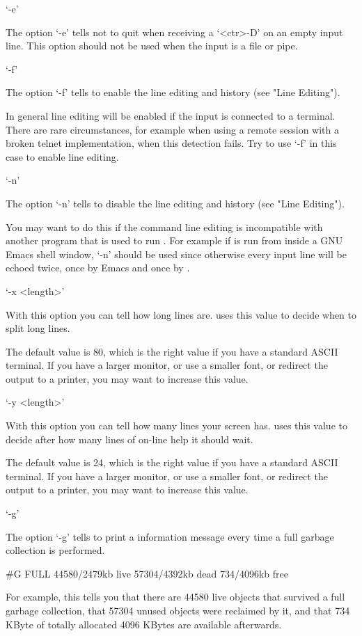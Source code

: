 `-e'

The option `-e' tells {\GAP} not to quit when receiving a `<ctr>-D' on an
empty  input line.  This option  should not be  used when  the input is a
file or pipe.

`-f'

The option `-f' tells {\GAP} to enable the line  editing and history (see
"Line Editing").

In general  line editing will  be enabled if the input  is connected to a
terminal.  There are rare circumstances, for  example when using a remote
session with a broken telnet  implementation, when this detection  fails.
Try to use `-f' in this case to enable line editing.

`-n'

The option  `-n'  tells {\GAP}  to disable  the line editing  and history
(see "Line Editing").

You may want to do this if the command line  editing is incompatible with
another program that is used to run {\GAP}.  For example if {\GAP} is run
from inside a GNU Emacs shell window, `-n' should be used since otherwise
every input line will be echoed twice, once by Emacs and once by {\GAP}.

`-x <length>'

With this option  you can tell  {\GAP}  how long lines  are.  {\GAP} uses
this value to decide when to split long lines.

The default value is 80, which is the right value if you have  a standard
ASCII terminal.  If you have a larger monitor, or use a  smaller font, or
redirect the output to a printer, you may want to increase this value.

`-y <length>'

With this option   you can tell {\GAP} how   many lines your  screen has.
{\GAP} uses this value to decide after how many lines  of on-line help it
should wait.

The default value is 24, which is the right  value if you have a standard
ASCII terminal.  If you have a larger monitor, or use  a smaller font, or
redirect the output to a printer, you may want to increase this value.

`-g'

The option  `-g' tells {\GAP} to print a information message every time a
full garbage collection is performed.

\begintt
    #G  FULL 44580/2479kb live   57304/4392kb dead   734/4096kb free
\endtt

For example, this tells   you that  there   are 44580 live  objects  that
survived a  full garbage   collection,  that 57304  unused  objects  were
reclaimed by it, and that 734 KByte of totally  allocated 4096 KBytes are
available afterwards.

